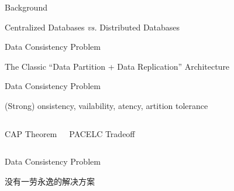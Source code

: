 
\begin{frame}{Background}
	\begin{center}
		Centralized Databases \emph{vs.} Distributed Databases

	\end{center}
\end{frame}

\begin{frame}{Data Consistency Problem}
	\begin{center}
		The Classic ``Data Partition + Data Replication'' Architecture

		\pause
	\end{center}
\end{frame}

\begin{frame}{Data Consistency Problem}
	\begin{center}
		(Strong) \underline{}onsistency, \underline{}vailability,
		\underline{}atency, \underline{}artition tolerance
	\end{center}
	\begin{columns}[c]
		\begin{center}
			CAP Theorem \\[2pt]
		\end{center}
		\begin{center}

			\vspace{0.50cm}
			PACELC Tradeoff \\[2pt]
		\end{center}
	\end{columns}
\end{frame}

\begin{frame}{Data Consistency Problem}
	\begin{center}

		\vspace{0.30cm}
		没有一劳永逸的解决方案
	\end{center}
\end{frame}

